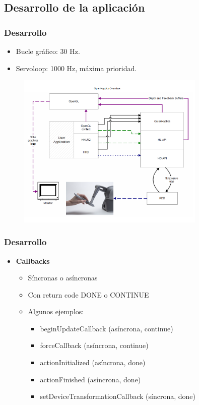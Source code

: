 \documentclass{beamer}
\begin{document}
\subsection{Desarrollo de la aplicación}
\begin{frame}
	\frametitle{Desarrollo}
		\begin{itemize}
		\item Bucle gráfico: 30 Hz.
		\item Servoloop: 1000 Hz, máxima prioridad.
	\end{itemize}
	\begin{figure}
	\centering
	\includegraphics[width=0.8\textwidth]{estructura}
	\end{figure}

\end{frame}
\begin{frame}
	\frametitle{Desarrollo}
	\begin{itemize}
		\item \textbf{Callbacks}
		\begin{itemize}
			\item Síncronas o asíncronas
			\item Con return code DONE o CONTINUE
			\item Algunos ejemplos:
			\begin{itemize}
				\item beginUpdateCallback (asíncrona, continue)
				\item forceCallback (asíncrona, continue)
				\item actionInitialized (asíncrona, done)
				\item actionFinished (asíncrona, done)
				\item setDeviceTransformationCallback (síncrona, done)
			\end{itemize}
		\end{itemize}

	\end{itemize}
	
\end{frame}
\end{document}
